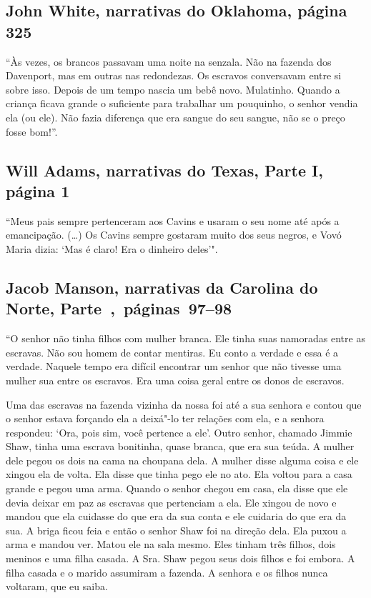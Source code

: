 \subsection{John White, narrativas do Oklahoma, página 325}
\label{ref284}

``Às vezes, os brancos passavam uma noite na senzala. Não na fazenda dos
Davenport, mas em outras nas redondezas. Os escravos conversavam entre
si sobre isso. Depois de um tempo nascia um bebê novo. Mulatinho. Quando
a criança ficava grande o suficiente para trabalhar um pouquinho, o
senhor vendia ela (ou ele). Não fazia diferença que era sangue do seu
sangue, não se o preço fosse bom!''.

\subsection{Will Adams, narrativas do Texas, Parte I, página 1} \label{ref03}

``Meus pais sempre pertenceram aos Cavins e usaram o seu nome até após a
emancipação. (\ldots{}) Os Cavins sempre gostaram muito dos seus negros,
e Vovó Maria dizia: `Mas é claro! Era o dinheiro deles'".

\subsection{Jacob Manson, narrativas da Carolina do Norte, Parte~,~páginas~97--98}
\label{ref181}

``O senhor não tinha filhos com mulher branca. Ele tinha suas namoradas
entre as escravas. Não sou homem de contar mentiras. Eu conto a verdade
e essa é a verdade. Naquele tempo era difícil encontrar um senhor que
não tivesse uma mulher sua entre os escravos. Era uma coisa geral entre
os donos de escravos.

Uma das escravas na fazenda vizinha da nossa foi até a sua senhora e
contou que o senhor estava forçando ela a deixá"-lo ter relações com ela,
e a senhora respondeu: `Ora, pois sim, você pertence a ele'. Outro
senhor, chamado Jimmie Shaw, tinha uma escrava bonitinha, quase branca,
que era sua teúda. A mulher dele pegou os dois na cama na choupana dela.
A mulher disse alguma coisa e ele xingou ela de volta. Ela disse que
tinha pego ele no ato. Ela voltou para a casa grande e pegou uma arma.
Quando o senhor chegou em casa, ela disse que ele devia deixar em paz as
escravas que pertenciam a ela. Ele xingou de novo e mandou que ela
cuidasse do que era da sua conta e ele cuidaria do que era da sua. A
briga ficou feia e então o senhor Shaw foi na direção dela. Ela puxou a
arma e mandou ver. Matou ele na sala mesmo. Eles tinham três filhos,
dois meninos e uma filha casada. A Sra. Shaw pegou seus dois filhos e
foi embora. A filha casada e o marido assumiram a fazenda. A senhora e
os filhos nunca voltaram, que eu saiba.

